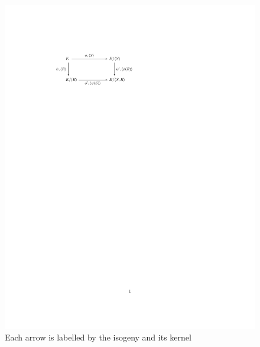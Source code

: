 \documentclass[runningheads,a4paper]{llncs}
\begin{document}
\ifx %
\begin{figure}[ht]\label{FigZKP}
\centering
\includegraphics[trim= 120 595 300 120, clip=true]{zkpdiagram.pdf}
\begin{center} \caption{Each arrow is labelled by the isogeny and its kernel}
\end{center}
\end{figure}
\fi
\end{document}
